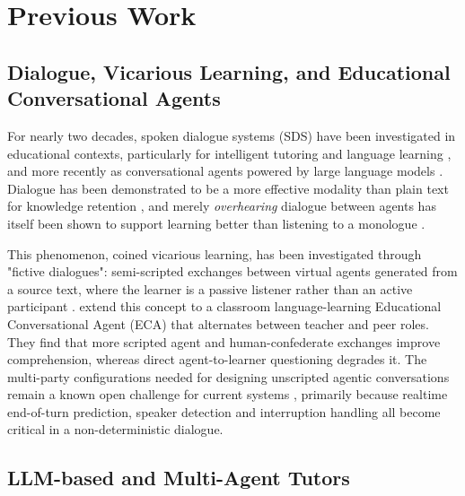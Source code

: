 \section{Previous Work}
\label{sec:previous_work}


\subsection{Dialogue, Vicarious Learning, and Educational Conversational Agents}
\label{sec:background}

For nearly two decades, spoken dialogue systems (SDS) have been
investigated in educational contexts, particularly for intelligent
tutoring \citep{litman2004itspoke, pon-barry2004scot} and language
learning \citep{seneff-etal-2007-spoken, bibauw2019dialogue}, and more
recently as conversational agents powered by large language models
\citep{Sydorenko2025}. Dialogue has been demonstrated to be a more effective modality than plain
text for knowledge retention \citep{ginns2013designing}, and merely
\emph{overhearing} dialogue between agents has itself been shown to
support learning better than listening to a monologue \citep{vicarious_learning}.

This phenomenon, coined vicarious learning, has been investigated
through "fictive dialogues": semi-scripted exchanges between virtual
agents generated from a source text, where the learner is a passive
listener rather than an active participant \citep{piwek2007t2d}.
\citet{fictive_dialogs} extend this concept to a classroom
language-learning Educational Conversational Agent (ECA) that
alternates between teacher and peer roles. They find that more
scripted agent and human-confederate exchanges improve comprehension, whereas
direct agent-to-learner questioning degrades it.
The multi-party configurations needed for designing unscripted agentic
conversations remain a known open challenge for current systems
\citep{aylett2023you, skantze2021turntaking}, primarily because
realtime end-of-turn prediction, speaker detection and interruption
handling all become critical in a non-deterministic dialogue. 

\subsection{LLM-based and Multi-Agent Tutors}
\label{sec:llm_tutors}

